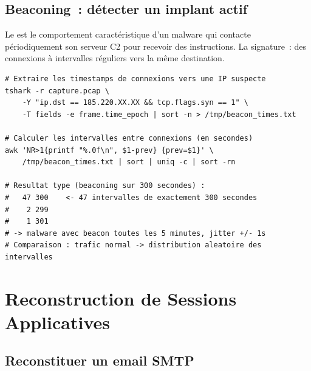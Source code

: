 \subsection{Beaconing~: détecter un implant actif}

Le  est le comportement caractéristique
d'un malware qui contacte périodiquement son serveur C2 pour recevoir
des instructions. La signature~: des connexions à intervalles
réguliers vers la même destination.

\begin{lstlisting}[language=bash_forensique,
    caption={Détection de beaconing dans une capture}]
# Extraire les timestamps de connexions vers une IP suspecte
tshark -r capture.pcap \
    -Y "ip.dst == 185.220.XX.XX && tcp.flags.syn == 1" \
    -T fields -e frame.time_epoch | sort -n > /tmp/beacon_times.txt

# Calculer les intervalles entre connexions (en secondes)
awk 'NR>1{printf "%.0f\n", $1-prev} {prev=$1}' \
    /tmp/beacon_times.txt | sort | uniq -c | sort -rn

# Resultat type (beaconing sur 300 secondes) :
#   47 300    <- 47 intervalles de exactement 300 secondes
#    2 299
#    1 301
# -> malware avec beacon toutes les 5 minutes, jitter +/- 1s
# Comparaison : trafic normal -> distribution aleatoire des intervalles
\end{lstlisting}

\section{Reconstruction de Sessions Applicatives}
\label{sec:reconstruction-sessions}

\subsection{Reconstituer un email SMTP}

